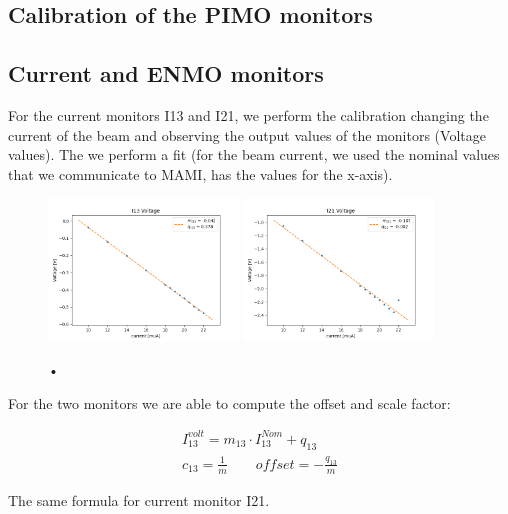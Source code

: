 \subsection{Calibration of the PIMO monitors}

\subsection{Current and ENMO monitors}

For the current monitors I13 and I21, we perform the calibration changing the current of the beam and observing the output values of the monitors (Voltage values). The we perform a fit (for the beam current, we used the nominal values that we communicate to MAMI, has the values for the x-axis).

\begin{figure}[hbtp]
\centering
\includegraphics[width = 0.45\textwidth]{Analysis/I13_Calibration.png}
\includegraphics[width = 0.45\textwidth]{Analysis/I21_Calibration.png} 
\caption{•}
\end{figure}

For the two monitors we are able to compute the offset and scale factor:

\begin{equation}
\begin{split}
I^{volt}_{13} = m_{13} \cdot I^{Nom}_{13} + q_{13}\\
c_{13} = \frac{1}{m} \qquad offset = -\frac{q_{13}}{m}
\end{split}
\end{equation}

The same formula for current monitor I21.

